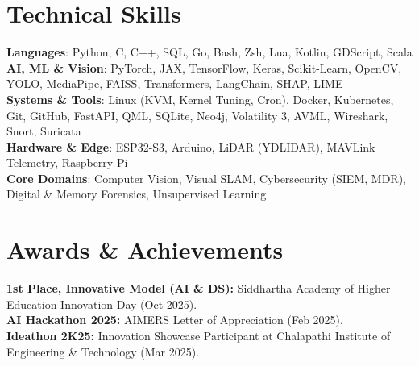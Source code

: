 \documentclass[letterpaper,11pt]{article}
\begin{document}
\section{Technical Skills}
 \begin{itemize}[leftmargin=20pt, label={}]
    \small{\item{
     \textbf{Languages}{: Python, C, C++, SQL, Go, Bash, Zsh, Lua, Kotlin, GDScript, Scala} \\
     \textbf{AI, ML \& Vision}{: PyTorch, JAX, TensorFlow, Keras, Scikit-Learn, OpenCV, YOLO, MediaPipe, FAISS, Transformers, LangChain, SHAP, LIME} \\
     \textbf{Systems \& Tools}{: Linux (KVM, Kernel Tuning, Cron), Docker, Kubernetes, Git, GitHub, FastAPI, QML, SQLite, Neo4j, Volatility 3, AVML, Wireshark, Snort, Suricata} \\
     \textbf{Hardware \& Edge}{: ESP32-S3, Arduino, LiDAR (YDLIDAR), MAVLink Telemetry, Raspberry Pi} \\
     \textbf{Core Domains}{: Computer Vision, Visual SLAM, Cybersecurity (SIEM, MDR), Digital \& Memory Forensics, Unsupervised Learning}
    }}
 \end{itemize}

\section{Awards \& Achievements}
 \begin{itemize}[leftmargin=20pt, label={}]
    \small{\item{
     \textbf{1st Place, Innovative Model (AI \& DS):} Siddhartha Academy of Higher Education Innovation Day (Oct 2025). \\
     \textbf{AI Hackathon 2025:} AIMERS Letter of Appreciation (Feb 2025). \\
     \textbf{Ideathon 2K25:} Innovation Showcase Participant at Chalapathi Institute of Engineering \& Technology (Mar 2025).
    }}
 \end{itemize}
 \vspace{-10pt}
\end{document}
